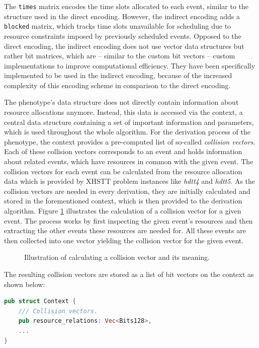 \documentclass[english,examples]{isasthesis}
\begin{document}
The \lstinline[language=Rust]|times| matrix encodes the time slots allocated
to each event, similar to the structure used in the direct encoding. However,
the indirect encoding adds a \lstinline[language=Rust]|blocked| matrix, which
tracks time slots unavailable for scheduling due to resource constraints imposed
by previously scheduled events. Opposed to the direct encoding, the indirect
encoding does not use vector data structures but rather bit matrices, which are
-- similar to the custom bit vectors -- custom implementations to improve
computational efficiency. They have been specifically implemented to be used
in the indirect encoding, because of the increased complexity of this encoding
scheme in comparison to the direct encoding.

The phenotype's data structure does not directly contain information about
resource allocations anymore. Instead, this data is accessed via the context,
a central data structure containing a set of important information and
parameters, which is used throughout the whole algorithm. For the derivation
process of the phenotype, the context provides a pre-computed list of
so-called \textit{collision vectors}. Each of these collision vectors
corresponds to an event and holds information about related events, which
have resources in common with the given event. The collision vectors for each
event can be calculated from the resource allocation data which is provided by
XHSTT problem instances like \textit{hdtt4} and \textit{hdtt5}. As the
collision vectors are needed in every derivation, they are initially
calculated and stored in the forementioned context, which is then provided to
the derivation algorithm.
%
Figure \ref{fig:pre_calc_collision_vec} illustrates the calculation of a
collision vector for a given event. The process works by first inspecting the
given event's resources and then extracting the other events these resources
are needed for. All these events are then collected into one vector yielding
the collision vector for the given event.
%
\begin{figure}
    \centering
    

    \caption{Illustration of calculating a collision vector and its meaning.}
    \label{fig:pre_calc_collision_vec}
\end{figure}
%
The resulting collision vectors are stored as a list of bit vectors on the
context as shown below:
\begin{lstlisting}[language=Rust]
pub struct Context {
    /// Collision vectors.
    pub resource_relations: Vec<Bits128>,
    ...
}
\end{lstlisting}
\end{document}
